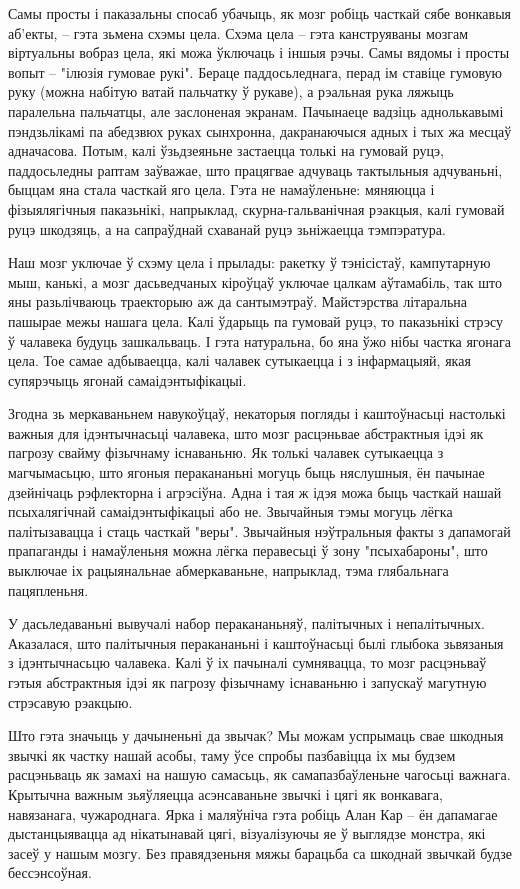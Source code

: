 Самы просты і паказальны спосаб убачыць, як мозг робіць часткай сябе вонкавыя аб'екты, – гэта зьмена схэмы цела. Схэма цела – гэта канструяваны мозгам віртуальны вобраз цела, які можа ўключаць і іншыя рэчы. Самы вядомы і просты вопыт – "ілюзія гумовае рукі". Бераце паддосьледнага, перад ім ставіце гумовую руку (можна набітую ватай пальчатку ў рукаве), а рэальная рука ляжыць паралельна пальчатцы, але заслоненая экранам. Пачынаеце вадзіць аднолькавымі пэндзьлікамі па абедзвюх руках сынхронна, дакранаючыся адных і тых жа месцаў адначасова. Потым, калі ўзьдзеяньне застаецца толькі на гумовай руцэ, паддосьледны раптам заўважае, што працягвае адчуваць тактыльныя адчуваньні, быццам яна стала часткай яго цела. Гэта не намаўленьне: мяняюцца і фізыялягічныя паказьнікі, напрыклад, скурна-гальванічная рэакцыя, калі гумовай руцэ шкодзяць, а на сапраўднай схаванай руцэ зьніжаецца тэмпэратура.

Наш мозг уключае ў схэму цела і прылады: ракетку ў тэнісістаў, кампутарную мыш, канькі, а мозг дасьведчаных кіроўцаў уключае цалкам аўтамабіль, так што яны разьлічваюць траекторыю аж да сантымэтраў. Майстэрства літаральна пашырае межы нашага цела. Калі ўдарыць па гумовай руцэ, то паказьнікі стрэсу ў чалавека будуць зашкальваць. І гэта натуральна, бо яна ўжо нібы частка ягонага цела. Тое самае адбываецца, калі чалавек сутыкаецца і з інфармацыяй, якая супярэчыць ягонай самаідэнтыфікацыі.

Згодна зь меркаваньнем навукоўцаў, некаторыя погляды і каштоўнасьці настолькі важныя для ідэнтычнасьці чалавека, што мозг расцэньвае абстрактныя ідэі як пагрозу свайму фізычнаму існаваньню. Як толькі чалавек сутыкаецца з магчымасьцю, што ягоныя перакананьні могуць быць няслушныя, ён пачынае дзейнічаць рэфлекторна і агрэсіўна. Адна і тая ж ідэя можа быць часткай нашай псыхалягічнай самаідэнтыфікацыі або не. Звычайныя тэмы могуць лёгка палітызавацца і стаць часткай "веры". Звычайныя нэўтральныя факты з дапамогай прапаганды і намаўленьня можна лёгка перавесьці ў зону "псыхабароны", што выключае іх рацыянальнае абмеркаваньне, напрыклад, тэма глябальнага пацяпленьня.

У дасьледаваньні вывучалі набор перакананьняў, палітычных і непалітычных. Аказалася, што палітычныя перакананьні і каштоўнасьці былі глыбока зьвязаныя з ідэнтычнасьцю чалавека. Калі ў іх пачыналі сумнявацца, то мозг расцэньваў гэтыя абстрактныя ідэі як пагрозу фізычнаму існаваньню і запускаў магутную стрэсавую рэакцыю.

Што гэта значыць у дачыненьні да звычак? Мы можам успрымаць свае шкодныя звычкі як частку нашай асобы, таму ўсе спробы пазбавіцца іх мы будзем расцэньваць як замахі на нашую самасьць, як самапазбаўленьне чагосьці важнага. Крытычна важным зьяўляецца асэнсаваньне звычкі і цягі як вонкавага, навязанага, чужароднага. Ярка і маляўніча гэта робіць Алан Кар – ён дапамагае дыстанцыявацца ад нікатынавай цягі, візуалізуючы яе ў выглядзе монстра, які засеў у нашым мозгу. Без правядзеньня мяжы барацьба са шкоднай звычкай будзе бессэнсоўная.

